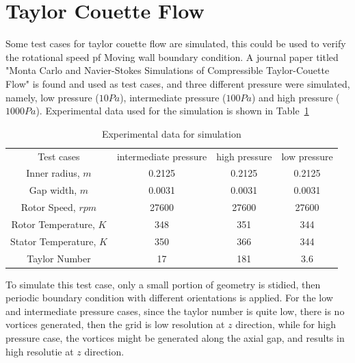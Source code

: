 
\section{Taylor Couette Flow}
\label{taylor-couette}
%
Some test cases for taylor couette flow are simulated, this could be used to verify 
the rotational speed pf Moving wall boundary condition. A journal paper titled "Monta Carlo
and Navier-Stokes Simulations of Compressible Taylor-Couette Flow" is found and used as test
cases, and three different pressure were simulated, namely, low pressure ($10Pa$), intermediate
pressure ($100Pa$) and high pressure ($1000Pa$). Experimental data used for the simulation is
shown in Table~\ref{ex_data}

\begin{table}
  \caption{Experimental data for simulation}
  \label{ex_data}
  \begin{center}
    \begin{tabular}{cccc}
     \hline
     \hline
     Test cases & intermediate pressure & high pressure & low pressure \\
     Inner radius, $m$ & 0.2125 & 0.2125 & 0.2125 \\
     Gap width, $m$ & 0.0031 & 0.0031 & 0.0031 \\
     Rotor Speed, $rpm$ & 27600 & 27600 & 27600 \\
     Rotor Temperature, $K$ & 348 & 351 & 344 \\
     Stator Temperature, $K$ & 350 & 366 & 344 \\
     Taylor Number & 17 & 181 & 3.6 \\
     \hline
     \hline
    \end{tabular}
  \end{center}
\end{table}

\medskip
To simulate this test case, only a small portion of geometry is stidied, then periodic boundary
condition with different orientations is applied. For the low and intermediate pressure cases,
since the taylor number is quite low, there is no vortices generated, then the grid is low resolution
at $z$ direction, while for high pressure case, the vortices might be generated along the axial gap,
and results in high resolutie at $z$ direction.


